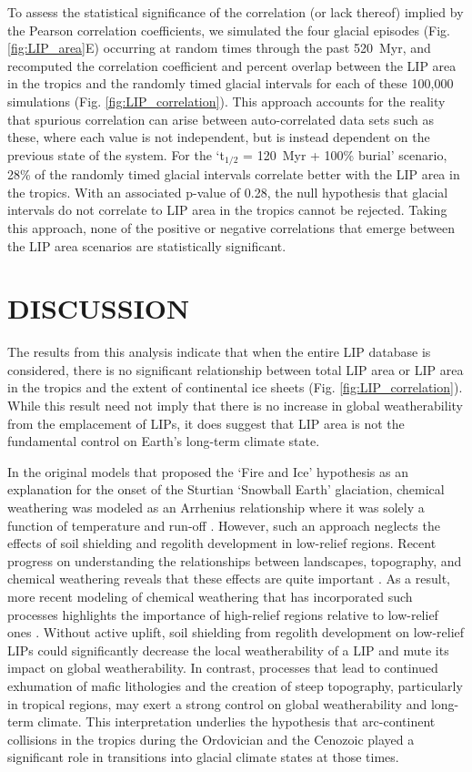 \documentclass[11pt,letterpaper]{article}
\begin{document}
To assess the statistical significance of the correlation (or lack thereof) implied by the Pearson correlation coefficients, we simulated the four glacial episodes (Fig. \ref{fig:LIP_area}E) occurring at random times through the past 520~Myr, and recomputed the correlation coefficient and percent overlap between the LIP area in the tropics and the randomly timed glacial intervals for each of these 100,000 simulations (Fig. \ref{fig:LIP_correlation}). This approach accounts for the reality that spurious correlation can arise between auto-correlated data sets such as these, where each value is not independent, but is instead dependent on the previous state of the system. For the `t$_{1/2}$ = 120~Myr + 100\% burial' scenario, 28\% of the randomly timed glacial intervals correlate better with the LIP area in the tropics. With an associated p-value of 0.28, the null hypothesis that glacial intervals do not correlate to LIP area in the tropics cannot be rejected. Taking this approach, none of the positive or negative correlations that emerge between the LIP area scenarios are statistically significant.

\section*{DISCUSSION}

The results from this analysis indicate that when the entire LIP database is considered, there is no significant relationship between total LIP area or LIP area in the tropics and the extent of continental ice sheets (Fig. \ref{fig:LIP_correlation}). While this result need not imply that there is no increase in global weatherability from the emplacement of LIPs, it does suggest that LIP area is not the fundamental control on Earth's long-term climate state.

In the original models that proposed the `Fire and Ice' hypothesis as an explanation for the onset of the Sturtian `Snowball Earth' glaciation, chemical weathering was modeled as an Arrhenius relationship where it was solely a function of temperature and run-off \citep{Donnadieu2004a}. However, such an approach neglects the effects of soil shielding and regolith development in low-relief regions. Recent progress on understanding the relationships between landscapes, topography, and chemical weathering reveals that these effects are quite important \citep{Gabet2009a, Maher2014a}. As a result, more recent modeling of chemical weathering that has incorporated such processes highlights the importance of high-relief regions relative to low-relief ones \citep{Godderis2017b}. Without active uplift, soil shielding from regolith development on low-relief LIPs could significantly decrease the local weatherability of a LIP and mute its impact on global weatherability. In contrast, processes that lead to continued exhumation of mafic lithologies and the creation of steep topography, particularly in tropical regions, may exert a strong control on global weatherability and long-term climate. This interpretation underlies the hypothesis that arc-continent collisions in the tropics during the Ordovician \citep{Swanson-Hysell2017a} and the Cenozoic \citep{Jagoutz2016a} played a significant role in transitions into glacial climate states at those times.
\end{document}
